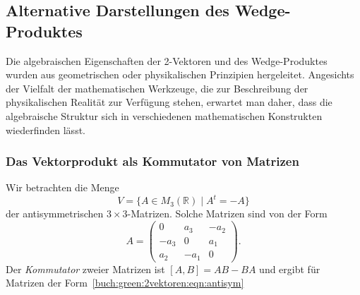 \subsection{Alternative Darstellungen des Wedge-Produktes}
Die algebraischen Eigenschaften der 2-Vektoren und des Wedge-Produktes
wurden aus geometrischen oder physikalischen Prinzipien hergeleitet.
Angesichts der Vielfalt der mathematischen Werkzeuge, die zur Beschreibung
der physikalischen Realität zur Verfügung stehen, erwartet man daher,
dass die algebraische Struktur sich in verschiedenen mathematischen
Konstrukten wiederfinden lässt.

%
%
\subsubsection{Das Vektorprodukt als Kommutator von Matrizen}
Wir betrachten die Menge 
\[
V
=
\{ A\in M_3(\mathbb{R}) \mid A^t=-A\}
\]
der antisymmetrischen $3\times 3$-Matrizen.
%
Solche Matrizen sind von der Form
\begin{equation}
A
=
\begin{pmatrix}
  0  &  a_3 & -a_2 \\
-a_3 &   0  &  a_1 \\
 a_2 & -a_1 &   0
\end{pmatrix}.
\label{buch:green:2vektoren:eqn:antisym}
\end{equation}
Der \emph{Kommutator} zweier Matrizen ist $[A,B]=AB-BA$ und ergibt
%
für Matrizen der Form~\eqref{buch:green:2vektoren:eqn:antisym}
